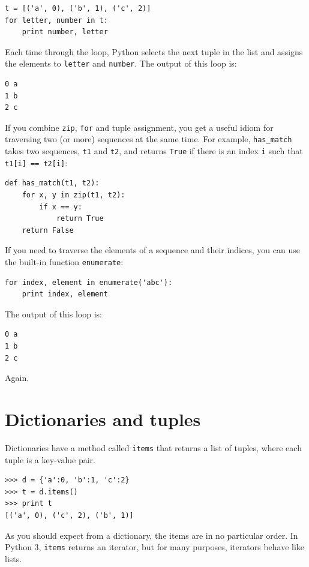 \documentclass[10pt]{book}
\begin{document}
\begin{verbatim}
t = [('a', 0), ('b', 1), ('c', 2)]
for letter, number in t:
    print number, letter
\end{verbatim}
%
Each time through the loop, Python selects the next tuple in
the list and assigns the elements to {\tt letter} and 
{\tt number}.  The output of this loop is:

\begin{verbatim}
0 a
1 b
2 c
\end{verbatim}
%
If you combine {\tt zip}, {\tt for} and tuple assignment, you get a
useful idiom for traversing two (or more) sequences at the same
time.  For example, \verb"has_match" takes two sequences, {\tt t1} and
{\tt t2}, and returns {\tt True} if there is an index {\tt i}
such that {\tt t1[i] == t2[i]}:

\begin{verbatim}
def has_match(t1, t2):
    for x, y in zip(t1, t2):
        if x == y:
            return True
    return False
\end{verbatim}
%
If you need to traverse the elements of a sequence and their
indices, you can use the built-in function {\tt enumerate}:

\begin{verbatim}
for index, element in enumerate('abc'):
    print index, element
\end{verbatim}
%
The output of this loop is:

\begin{verbatim}
0 a
1 b
2 c
\end{verbatim}
%
Again.


\section{Dictionaries and tuples}
\label{dictuple}

Dictionaries have a method called {\tt items} that returns a list of
tuples, where each tuple is a key-value pair.

\begin{verbatim}
>>> d = {'a':0, 'b':1, 'c':2}
>>> t = d.items()
>>> print t
[('a', 0), ('c', 2), ('b', 1)]
\end{verbatim}
%
As you should expect from a dictionary, the items are in no
particular order.  In Python 3, {\tt items} returns an iterator,
but for many purposes, iterators behave like lists.
\end{document}
